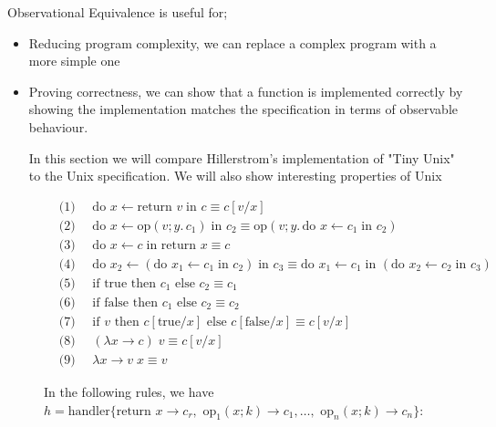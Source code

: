 \documentclass[logo,bsc,singlespacing,parskip]{infthesis}
\begin{document}
Observational Equivalence is useful for;
\begin{itemize}
    \item Reducing program complexity, we can replace a complex program with a more simple one
    \item Proving correctness, we can show that a function is implemented correctly by showing the implementation matches the specification in terms of observable behaviour.

In this section we will compare Hillerstrom's implementation of "Tiny Unix" to the Unix specification. We will also show interesting properties of Unix  

\end{itemize}
\begin{figure}[h]
    \centering
    \begin{tcolorbox}[colframe=black, colback=white, sharp corners]
    \begin{align*}
        &\text{(1) } \quad \text{do } x \leftarrow \text{return } v \; \text{in } c \equiv c[v/x] \\
        &\text{(2) } \quad \text{do } x \leftarrow \text{op}(v; y.\, c_1) \; \text{in } c_2 \equiv \text{op}(v; y.\, \text{do } x \leftarrow c_1 \; \text{in } c_2) \\
        &\text{(3) } \quad \text{do } x \leftarrow c \; \text{in return } x \equiv c \\
        &\text{(4) } \quad \text{do } x_2 \leftarrow (\text{do } x_1 \leftarrow c_1 \; \text{in } c_2) \; \text{in } c_3 \equiv \text{do } x_1 \leftarrow c_1 \; \text{in } (\text{do } x_2 \leftarrow c_2 \; \text{in } c_3) \\
        &\text{(5) } \quad \text{if true then } c_1 \text{ else } c_2 \equiv c_1 \\
        &\text{(6) } \quad \text{if false then } c_1 \text{ else } c_2 \equiv c_2 \\
        &\text{(7) } \quad \text{if } v \text{ then } c[\text{true}/x] \text{ else } c[\text{false}/x] \equiv c[v/x] \\
        &\text{(8) } \quad (\lambda x \rightarrow c) \; v \equiv c[v/x] \\
        &\text{(9) } \quad \lambda x \rightarrow v \; x \equiv v 
    \end{align*}
    \end{tcolorbox}
    \vspace{1em}
    
    In the following rules, we have \( h = \text{handler} \{ \text{return } x \rightarrow c_r, \text{ op}_1(x; k) \rightarrow c_1, \ldots, \text{ op}_n(x; k) \rightarrow c_n \} \):
    \vspace{1em}


\end{figure}
\end{document}
